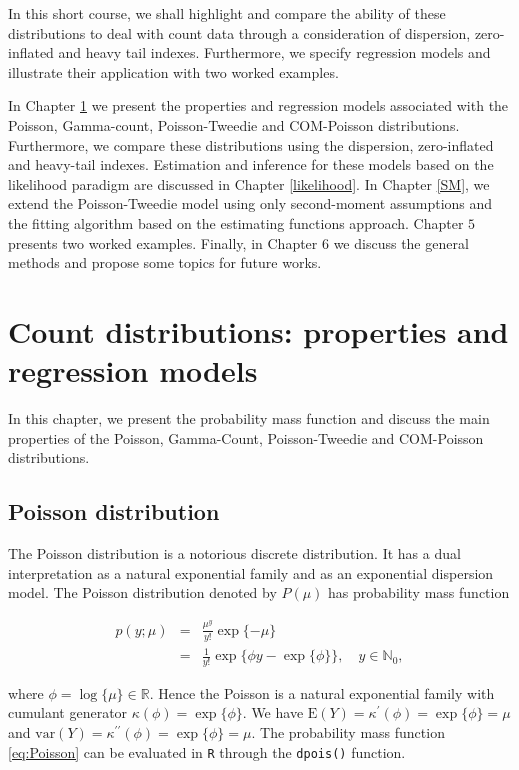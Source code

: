 \documentclass[9pt,a5paper,]{book}
\theoremstyle{definition}
\theoremstyle{definition}
\theoremstyle{remark}
\begin{document}
In this short course, we shall highlight and compare the ability of
these distributions to deal with count data through a consideration of
dispersion, zero-inflated and heavy tail indexes. Furthermore, we
specify regression models and illustrate their application with two
worked examples.

In Chapter \ref{models} we present the properties and regression models
associated with the Poisson, Gamma-count, Poisson-Tweedie and
COM-Poisson distributions. Furthermore, we compare these distributions
using the dispersion, zero-inflated and heavy-tail indexes. Estimation
and inference for these models based on the likelihood paradigm are
discussed in Chapter \ref{likelihood}. In Chapter \ref{SM}, we extend
the Poisson-Tweedie model using only second-moment assumptions and the
fitting algorithm based on the estimating functions approach. Chapter
\(5\) presents two worked examples. Finally, in Chapter \(6\) we discuss
the general methods and propose some topics for future works.

\chapter{Count distributions: properties and regression
models}\label{models}

In this chapter, we present the probability mass function and discuss
the main properties of the Poisson, Gamma-Count, Poisson-Tweedie and
COM-Poisson distributions.

\section{Poisson distribution}\label{poisson-distribution}

The Poisson distribution is a notorious discrete distribution. It has a
dual interpretation as a natural exponential family and as an
exponential dispersion model. The Poisson distribution denoted by
\(P(\mu)\) has probability mass function

\begin{eqnarray}
p(y;\mu) &=& \frac{\mu^y}{y!}\exp\{-\mu\} \nonumber \\
         &=& \frac{1}{y!} \exp \{\phi y -  \exp\{\phi\} \}, \quad y \in \mathbb{N}_{0},
\label{eq:Poisson}
\end{eqnarray}

where \(\phi = \log \{\mu\} \in \mathbb{R}\). Hence the Poisson is a
natural exponential family with cumulant generator
\(\kappa(\phi) = \exp\{\phi\}\). We have
\(\mathrm{E}(Y) = \kappa^{\prime}(\phi) = \exp\{\phi\} = \mu\) and
\(\mathrm{var}(Y) = \kappa^{\prime \prime}(\phi) = \exp\{\phi\} = \mu\).
The probability mass function \eqref{eq:Poisson} can be evaluated in
\texttt{R} through the \texttt{dpois()} function.
\end{document}
